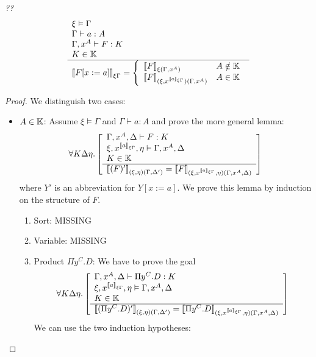 \begin{theorem}
    \label{TypeInterpretationSubstitution}
    \emph{??}
    $$
    \rulev{
        \xi \vDash \Gamma
        \\
        \Gamma \vdash a: A
        \\
        \Gamma,x^A \vdash F : K
        \\
        K \in \Kinds
    }
    {
        \typeinter{F[x:=a]}{\xi\Gamma}
        =
        \left\{
        \begin{array}{ll}
            \typeinter{F}{\xi(\Gamma,x^A)}
            &
            A \notin \Kinds
            \\
            \typeinter{F}{(\xi,x^{\typeinter{a}{\xi\Gamma}})(\Gamma,x^A)}
            &
            A \in \Kinds
        \end{array}
        \right.
    }
    $$
    \begin{proof}
        \def\tintera{{\typeinter{a}{\xi\Gamma}}}

        We distinguish two cases:
        \begin{itemize}
        \def\subgoal#1#2#3#4{
            \typeinter{(#1)'}{(\xi,#4)(\Gamma,#3')}
            =
            \typeinter{#1}{(\xi,x^\tintera,#4)(\Gamma,x^A,#3)}
        }
        \def\goal#1#2#3#4{
            \ruleall{#2#3#4}
            {
                \Gamma,x^A,#3 \vdash #1 : #2
                \\
                \xi,x^\tintera,\eta \vDash \Gamma,x^A,#3
                \\
                #2 \in \Kinds
            }
            {
                \subgoal {#1} {#2} {#3} {#4}
            }
        }
        \item $A \in \mathbb{K}$: Assume $\xi \vDash \Gamma$ and $\Gamma \vdash a:
            A$ and prove the more general lemma:
            $$
                \goal F K \Delta \eta
            $$
            where $Y'$ is an abbreviation for $Y[x:=a]$. We prove this lemma by
                induction on the structure of $F$.
            \begin{enumerate}
            \item Sort:
                MISSING

            \item Variable:
                MISSING

            \item Product $\Pi y^C.D$:
                We have to prove the goal
                $$
                    \goal {\Pi y^C.D} K \Delta \eta
                $$
                We can use the two induction hypotheses:
                \begin{enumerate}


\end{enumerate}
\end{enumerate}
\end{itemize}
\end{proof}
\end{theorem}
